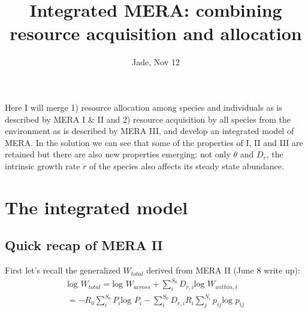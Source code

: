 \documentclass[12pt]{article}
\date{}
\title{\Large \textbf{Integrated MERA: combining resource acquisition and allocation}}
\author{Jade, Nov 12}
\begin{document}
\maketitle
\raggedright
\large
\setlength{\parindent}{15pt}
Here I will merge 1) resource allocation among species and individuals as is described by MERA I \& II and 2) resource acquisition by all species from the environment as is described by MERA III, and develop an integrated model of MERA. In the solution we can see that some of the properties of I, II and III are retained but there are also new properties emerging: not only $\theta$ and $D_r$, the intrinsic growth rate $r$ of the species also affects its steady state abundance.

\tableofcontents
\listoffigures

\section{The integrated model}
\subsection{Quick recap of MERA II}
First let's recall the generalized $W_{total}$ derived from MERA II (June 8 write up):
 \begin{equation}
 \begin{split}
 \mbox{log }W_{total} =  \mbox{log }W_{across}+\sum^{S_0}_i D_{r,i} \mbox{log }W_{within,i}\\
 =  - R_{0}\sum^{S_0}_i P_i\mbox{log } P_i - \sum^{S_0}_i D_{r,i} R_i  \sum^{N_i}_j p_{ij} \mbox{log } p_{ij}
 \end{split}
\end{equation}
\end{document}
